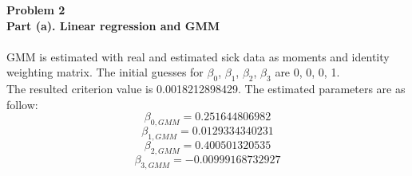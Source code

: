 \documentclass[letterpaper,12pt]{article}
\theoremstyle{definition}
\begin{document}
\noindent\textbf{Problem 2} \\
\noindent\textbf{Part (a). Linear regression and GMM} \\
\\
GMM is estimated with real and estimated sick data as moments and identity weighting matrix. The initial guesses for $\beta_0$, $\beta_1$, $\beta_2$, $\beta_3$ are 0, 0, 0, 1.\\
The resulted criterion value is 0.0018212898429. The estimated parameters are as follow: \\
\[\beta_{0, GMM}= 0.251644806982\]
\[\beta_{1, GMM}= 0.0129334340231\]
\[\beta_{2, GMM}= 0.400501320535\]
\[\beta_{3, GMM}= -0.00999168732927\]
\\
\end{document}
